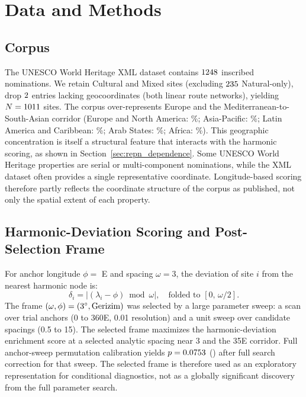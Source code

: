 \documentclass[12pt,a4paper]{article}
\newcommand{\degr}{\ifmmode{^\circ}\else\textdegree{}\fi}
\begin{document}
\section{Data and Methods}
\label{sec:methods}

\subsection{Corpus}

The UNESCO World Heritage XML dataset \citep{unescowhc2024xml} contains
$1248$ inscribed nominations. We retain Cultural and Mixed sites
(excluding $235$ Natural-only), drop $2$ entries lacking
geocoordinates (both linear route networks), yielding $N = 1011$
sites. The corpus over-represents Europe and the Mediterranean-to-South-Asian
corridor (Europe and North America: \CorpusPctEurope\%; Asia-Pacific:
\CorpusPctAsiaPac\%; Latin America and Caribbean: \CorpusPctLatAm\%;
Arab States: \CorpusPctArabStates\%; Africa: \CorpusPctAfrica\%). This
geographic concentration is itself a structural feature that interacts with
the harmonic scoring, as shown in Section~\ref{sec:repn_dependence}.
Some UNESCO World Heritage properties are serial or multi-component
nominations, while the XML dataset often provides a single representative
coordinate. Longitude-based scoring therefore partly reflects the coordinate
structure of the corpus as published, not only the spatial extent of each
property.

\subsection{Harmonic-Deviation Scoring and Post-Selection Frame}

For anchor longitude $\phi =$ \GerizimLon\textdegree{}E and spacing
$\omega = 3$\textdegree{}, the deviation of site $i$ from the nearest
harmonic node is:
\[
  \delta_i = \bigl|(\lambda_i - \phi)\bmod \omega\bigr|,
  \quad \text{folded to } [0,\, \omega/2].
\]
The frame $(\omega, \phi) = (3\degr{}, \text{Gerizim})$ was selected by a
large parameter sweep: a scan over \anchorSweepNanchors{} trial anchors
(0\textdegree{} to 360\textdegree{}E, 0.01\textdegree{} resolution) and a
unit sweep over candidate spacings (0.5\textdegree{} to 15\textdegree{}).
The selected frame maximizes the harmonic-deviation enrichment score at a
selected analytic spacing near 3\textdegree{} and the 35\textdegree{}E
corridor. Full anchor-sweep permutation calibration yields $p = 0.0753$
(\anchorMaxPermPSig{}) after full search correction for that sweep.
The selected frame is therefore used as an exploratory representation for
conditional diagnostics, not as a globally significant discovery from the full
parameter search.
\end{document}
